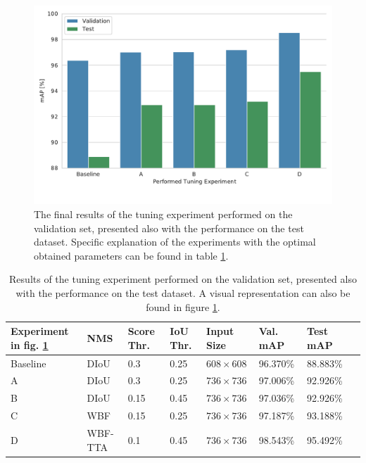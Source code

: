 \begin{figure}
\begin{center}
    \includegraphics[width=\columnwidth]{imgs/yolo_all_tuning.pdf}
    \caption{The final results of the tuning experiment performed on the validation set, presented also with the performance on the test dataset. Specific explanation of the experiments with the optimal obtained parameters can be found in table \ref{tab:yolo_tuning_combined_results}.}
    \label{fig:yolo_tuning_combined_results}
\end{center}
\end{figure}

\begin{table}[H]
\footnotesize
\begin{center}
\begin{tabular}{|l|l|l|l|l|l|l|l|}

\hline
\textbf{Experiment in fig. \ref{fig:yolo_tuning_combined_results}} & \textbf{NMS} & \textbf{Score Thr.} & \textbf{IoU Thr.} & \textbf{Input Size} & \textbf{Val. mAP} & \textbf{Test mAP}\\
\hline
Baseline & DIoU    & 0.3  & 0.25 & $608 \times 608$ & 96.370\% & 88.883\% \\
\hline
A        & DIoU    & 0.3  & 0.25 & $736 \times 736$ & 97.006\% & 92.926\% \\
\hline
B        & DIoU    & 0.15 & 0.45 & $736 \times 736$ & 97.036\% & 92.926\% \\
\hline
C        & WBF     & 0.15 & 0.25 & $736 \times 736$ & 97.187\% & 93.188\% \\
\hline
D        & WBF-TTA & 0.1  & 0.45 & $736 \times 736$ & \cellcolor{green}98.543\% & \cellcolor{green}95.492\% \\
\hline
\end{tabular}
\caption{Results of the tuning experiment performed on the validation set, presented also with the performance on the test dataset. A visual representation can also be found in figure \ref{fig:yolo_tuning_combined_results}.}
\label{tab:yolo_tuning_combined_results}
\end{center}
\end{table}

